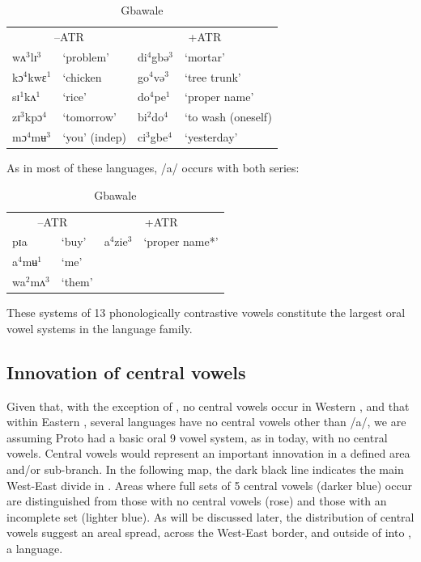\documentclass[output=paper
,newtxmath
,modfonts
,nonflat]{langsci/langscibook}
\begin{document}
\begin{table}
    \label{tab:zogbo:9}
    \caption{Gbawale \citep{Seri1987}}
\begin{tabular}{llll}
\multicolumn{2}{c}{–ATR} & \multicolumn{2}{c}{+ATR}\\

wʌ$^3$lɪ$^3$  &  ‘problem’  &     di$^4$gbə$^3$ & ‘mortar’ \\

kɔ$^4$kwɛ$^1$ & ‘chicken &      go$^4$və$^3$ &  ‘tree trunk’\\

sɪ$^1$kʌ$^1$ & ‘rice’  &       do$^4$pe$^1$ &  ‘proper name’ \\ 

zɪ$^3$kpɔ$^4$ & ‘tomorrow’   &    bi$^2$do$^4$ &  ‘to wash (oneself)\\

mɔ$^4$mʉ$^3$ & ‘you’ (indep)   &   ci$^3$gbe$^4$ & ‘yesterday’\\

\end{tabular}
\end{table}

As in most of these languages, /a/ occurs with both series: 


\begin{table}
\label{ex:zogbo:10}
\caption{Gbawale \citep{Seri1987}}
\begin{tabular}{llll}
\multicolumn{2}{c}{–ATR} & \multicolumn{2}{c}{+ATR}\\

pɪa  &  ‘buy’    &  a$^4$zie$^3$ &   ‘proper name*’\\ 

a$^4$mʉ$^1$  &  ‘me’ \\

wa$^2$mʌ$^3$ & ‘them’ \\
\end{tabular}
\end{table}

These systems of 13 phonologically contrastive vowels constitute the largest oral vowel systems in the  language family.  

\subsection{Innovation of central vowels}\label{sec:zogbo:2.1} 

Given that, with the exception of , no central vowels occur in Western , and that within Eastern , several languages have no central vowels other than /a/, we are assuming Proto  had a basic oral 9 vowel system, as in  today, with no central vowels.  Central vowels would represent an important innovation in a defined area and/or sub-branch.  In the following map, the dark black line indicates the main West-East divide in .  Areas where full sets of 5 central vowels (darker blue) occur are distinguished from those with no central vowels (rose) and those with an incomplete set (lighter blue). As will be discussed later, the distribution of central vowels suggest an areal spread, across the West-East border, and outside of  into , a  language.
\end{document}
